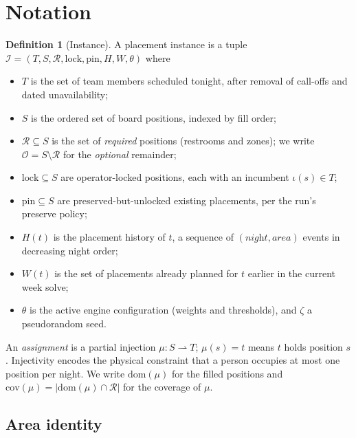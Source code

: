 \documentclass[11pt,a4paper]{article}
\theoremstyle{definition}
\newtheorem{definition}{Definition}
\theoremstyle{remark}
\begin{document}
\section{Notation}
\label{sec:notation}

\begin{definition}[Instance]
A placement instance is a tuple
$\mathcal{I} = (T, S, \mathcal{R}, \mathrm{lock}, \mathrm{pin}, H, W, \theta)$
where
\begin{itemize}[itemsep=0.15em,topsep=0.25em]
  \item $T$ is the set of team members scheduled tonight, after removal of
        call-offs and dated unavailability;
  \item $S$ is the ordered set of board positions, indexed by fill order;
  \item $\mathcal{R} \subseteq S$ is the set of \emph{required} positions
        (restrooms and zones); we write $\mathcal{O} = S \setminus
        \mathcal{R}$ for the \emph{optional} remainder;
  \item $\mathrm{lock} \subseteq S$ are operator-locked positions, each with
        an incumbent $\iota(s) \in T$;
  \item $\mathrm{pin} \subseteq S$ are preserved-but-unlocked existing
        placements, per the run's preserve policy;
  \item $H(t)$ is the placement history of $t$, a sequence of
        $(\textit{night}, \textit{area})$ events in decreasing night order;
  \item $W(t)$ is the set of placements already planned for $t$ earlier in
        the current week solve;
  \item $\theta$ is the active engine configuration (weights and thresholds),
        and $\zeta$ a pseudorandom seed.
\end{itemize}
\end{definition}

An \emph{assignment} is a partial injection $\mu : S \rightharpoonup T$;
$\mu(s) = t$ means $t$ holds position $s$. Injectivity encodes the physical
constraint that a person occupies at most one position per night. We write
$\mathrm{dom}(\mu)$ for the filled positions and
$\mathrm{cov}(\mu) = \lvert \mathrm{dom}(\mu) \cap \mathcal{R} \rvert$ for
the coverage of $\mu$.

\subsection{Area identity}
\end{document}
